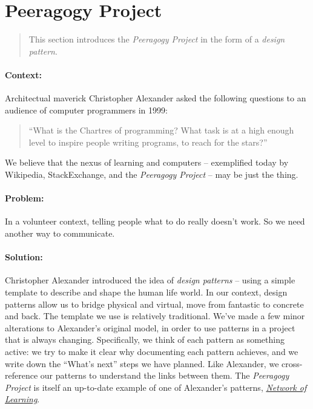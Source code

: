 \section{Peeragogy Project}

\begin{quote}
This section introduces the \emph{Peeragogy Project} in the form of a \emph{design pattern}.
\end{quote}

\paragraph{Context:}  Architectual maverick Christopher Alexander asked the following questions to an audience of computer programmers in 1999: 
\begin{quote}
``What is the Chartres of programming? What task is at a high enough level to inspire people writing programs, to reach for the stars?''
\end{quote}
We believe that the nexus of learning and computers -- exemplified today by Wikipedia, StackExchange, and the \emph{Peeragogy Project} -- may be just the thing.

\paragraph{Problem:} In a volunteer context, telling people what to do really doesn't work.  So we need another way to communicate.

\paragraph{Solution:} Christopher Alexander introduced the idea of \emph{design patterns} -- using a simple template to describe and shape the human life world.  In our context, design patterns allow us to bridge physical and virtual, move from fantastic to concrete and back.  The template we use is relatively traditional.  We've made a few minor alterations to Alexander's original model, in order to use patterns in a project that is always changing.  Specifically, we think of each pattern as something active: we try to make it clear why documenting each pattern achieves, and we write down the ``What's next'' steps we have planned.  Like Alexander, we cross-reference our patterns to understand the links between them.  The \emph{Peeragogy Project} is itself an up-to-date example of one of Alexander's patterns, \href{http://en.wikipedia.org/wiki/Networked_learning#1970s}{\emph{Network of Learning}}.

